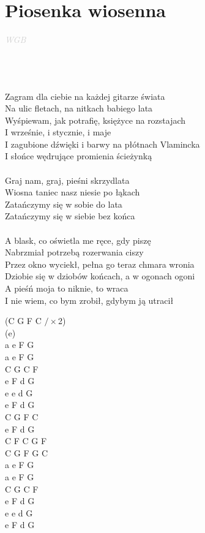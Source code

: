 \documentclass[a5paper, 10pt]{book}
\begin{document}
\newpage
\section{Piosenka wiosenna}\textcolor{lightgray}{\textit{WGB}}\\~\\
\begin{minipage}[t]{0.8\textwidth}
~\\~\\
Zagram dla ciebie na każdej gitarze świata\\
Na ulic fletach, na nitkach babiego lata\\
Wyśpiewam, jak potrafię, księżyce na rozstajach\\
I wrześnie, i stycznie, i maje\\
I zagubione dźwięki i barwy na płótnach Vlamincka\\
I słońce wędrujące promienia ścieżynką\\
\\
\hspace*{5mm}Graj nam, graj, pieśni skrzydlata\\
\hspace*{5mm}Wiosna taniec nasz niesie po łąkach\\
\hspace*{5mm}Zatańczymy się w sobie do lata\\
\hspace*{5mm}Zatańczymy się w siebie bez końca\\
\\
A blask, co oświetla me ręce, gdy piszę\\
Nabrzmiał potrzebą rozerwania ciszy\\
Przez okno wyciekł, pełna go teraz chmara wronia\\
Dziobie się w dziobów końcach, a w ogonach ogoni\\
A pieśń moja to niknie, to wraca\\
I nie wiem, co bym zrobił, gdybym ją utracił\\
\end{minipage}
\begin{minipage}[t]{0.2\textwidth}
(C G F C $/ \times $2)\\(e)\\
a e F G\\
a e F G\\
C G C F\\
e F d G\\
e e d G\\
e F d G\\

C G F C\\
e F d G\\
C F C G F\\
C G F G C\\

a e F G\\
a e F G\\
C G C F\\
e F d G\\
e e d G\\
e F d G\\

\end{minipage}
\end{document}
